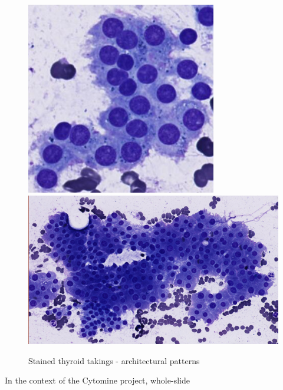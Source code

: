 \begin{figure}
{		\includegraphics[scale=0.5]{image/normal_pattern_1.png}
		\includegraphics[scale=0.5]{image/normal_pattern_2.png}
		\label{sfig:norm_patterns}
	}
	\caption{Stained thyroid takings - architectural patterns}
	\label{fig:intro_pattern_ex}
\end{figure}



In the context of the Cytomine project, whole-slide 